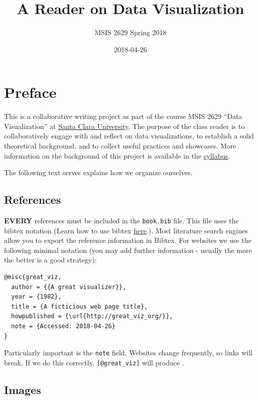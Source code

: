 \documentclass[]{book}
\title{A Reader on Data Visualization}
\author{MSIS 2629 Spring 2018}
\date{2018-04-26}
\theoremstyle{definition}
\theoremstyle{definition}
\theoremstyle{definition}
\theoremstyle{remark}
\begin{document}
\maketitle

{
\setcounter{tocdepth}{1}
\tableofcontents
}
\chapter{Preface}\label{preface}

This is a collaborative writing project as part of the course MSIS 2629
``Data Visualization'' at \href{http://www.scu.edu}{Santa Clara
University}. The purpose of the class reader is to collaboratively
engage with and reflect on data visualizations, to establish a solid
theoretical background, and to collect useful practices and showcases.
More information on the background of this project is available in the
\href{https://mschermann.github.io/msis2629spring2018}{syllabus}.

The following text serves explains how we organize ourselves.

\section{References}\label{references}

\textbf{EVERY} references must be included in the \texttt{book.bib}
file. This file uses the bibtex notation (Learn how to use bibtex
\href{http://www.bibtex.org/Using/}{here}.). Most literature search
engines allow you to export the reference information in Bibtex. For
websites we use the following minimal notation (you may add further
information - usually the more the better is a good strategy):

\begin{verbatim}
@misc{great_viz,
  author = {{A great visualizer}},
  year = {1982},
  title = {A ficticious web page title},
  howpublished = {\url{http://great_viz_org/}},
  note = {Accessed: 2018-04-26}
}
\end{verbatim}

Particularly important is the \texttt{note} field. Websites change
frequently, so links will break. If we do this correctly,
\texttt{{[}@great\_viz{]}} will produce \citep{great_viz}.

\section{Images}\label{images}
\end{document}
